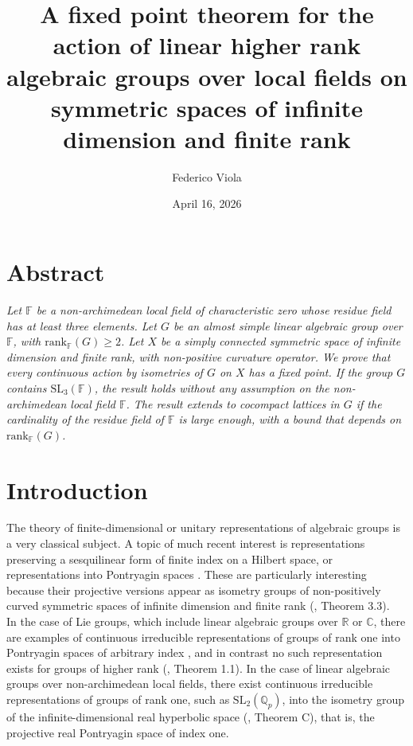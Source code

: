 \documentclass{article}
\title{A fixed point theorem for the action of linear higher rank algebraic groups over local fields on symmetric spaces of infinite dimension and finite rank}
\author{Federico Viola}
\date{April 16, 2026}
\theoremstyle{definition}
\theoremstyle{remark}
\theoremstyle{plain}
\begin{document}
\maketitle

\section*{Abstract}

\textit{Let $\mathbb{F}$ be a non-archimedean local field of characteristic zero whose residue field has at least three elements. Let $G$ be an almost simple linear algebraic group over $\mathbb{F}$, with $\mathrm{rank}_\mathbb{F}(G)\geq 2$. Let $X$ be a simply connected symmetric space of infinite dimension and finite rank, with non-positive curvature operator. We prove that every continuous action by isometries of $G$ on $X$ has a fixed point. If the group $G$ contains $\mathrm{SL}_3(\mathbb{F})$, the result holds without any assumption on the non-archimedean local field $\mathbb{F}$. The result extends to cocompact lattices in $G$ if the cardinality of the residue field of $\mathbb{F}$ is large enough, with a bound that depends on $\mathrm{rank}_\mathbb{F}(G)$.} \\

\section{Introduction}

The theory of finite-dimensional or unitary representations of algebraic groups is a very classical subject. A topic of much recent interest is representations preserving a sesquilinear form of finite index on a Hilbert space, or representations into Pontryagin spaces \cite{pontryagin}. These are particularly interesting because their projective versions appear as isometry groups of non-positively curved symmetric spaces of infinite dimension and finite rank (\cite{duc2023}, Theorem 3.3). \\

In the case of Lie groups, which include linear algebraic groups over $\mathbb{R}$ or $\mathbb{C}$, there are examples of continuous irreducible representations of groups of rank one into Pontryagin spaces of arbitrary index \cite{delzantpy,monodpy}, and in contrast no such representation exists for groups of higher rank (\cite{duc2023}, Theorem 1.1). In the case of linear algebraic groups over non-archimedean local fields, there exist continuous irreducible representations of groups of rank one, such as $\mathrm{SL}_2(\mathbb{Q}_p)$, into the isometry group of the infinite-dimensional real hyperbolic space (\cite{bim}, Theorem C), that is, the projective real Pontryagin space of index one. \\
\end{document}
